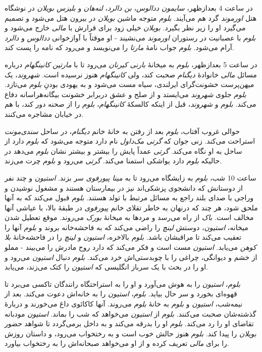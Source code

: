 \documentclass[12pt]{book}
\newcommand{\noun}[1]{\textit{\textcolor{black!70}{#1}}}
\begin{document}
    در ساعت 4 بعدازظهر، \noun{سایمون ددالوس}، \noun{بن دالرد}، \noun{لنه‌هان} و \noun{بلیزس بویلان} در نوشگاه هتل \noun{اورموند} گرد هم می‌آیند. \noun{بلوم} متوجه ماشین \noun{بویلان} در بیرون هتل می‌شود و تصمیم می‌گیرد او را زیر نظر بگیرد. \noun{بویلان} خیلی زود برای قرارش با \noun{مالی} خارج می‌شود و \noun{بلوم} با عصبانیت در رستوران \noun{اورموند} می‌نشیند - او موقتاً با آوازخوانی \noun{ددالوس} و \noun{دالرد} آرام می‌شود. \noun{بلوم} جواب نامۀ \noun{مارتا} را می‌نویسد و می‌رود که نامه را پست کند.

    در ساعت 5 بعدازظهر، \noun{بلوم} به میخانۀ \noun{بارنی کیرنان} می‌رود تا با \noun{مارتین کانینگهام} درباره مسائل \noun{مالی} خانوادۀ \noun{دیگنام} صحبت کند، ولی \noun{کانینگهام} هنوز نرسیده است. \noun{شهروند}، یک میهن‌پرست خشونت‌گرای ایرلندی، سیاه مست می‌شود و به یهودی بودنِ \noun{بلوم} می‌تازد. \noun{بلوم} جلوی \noun{شهروند} می‌ایستد و از صلح و عشق دربرابر خشونت بیگانه‌هراسانه دفاع می‌کند. \noun{بلوم} و \noun{شهروند}، قبل از اینکه کالسکۀ \noun{کانینگهام}، \noun{بلوم} را از صحنه دور کند، با هم در خیابان مشاجره می‌کنند.

    حوالی غروب آفتاب، \noun{بلوم} بعد از رفتن به خانۀ خانم \noun{دیگنام}، در ساحل \noun{سندی‌مونت} استراحت می‌کند. زنی جوان که \noun{گرتی مک‌داول} نام دارد متوجه می‌شود که \noun{بلوم} دارد از ساحل به او نگاه می‌کند. \noun{گرتی} عمداً پایش را بیشتر و بیشتر نشان \noun{بلوم} می‌دهد در حالیکه \noun{بلوم} دارد یواشکی استمنا می‌کند. \noun{گرتی} می‌رود و \noun{بلوم} چرت می‌زند.

    ساعت 10 شب، \noun{بلوم} به زایشگاه می‌رود تا به \noun{مینا پیورفوی} سر بزند. \noun{استیون} و چند نفر از دوستانش که دانشجوی پزشکی‌اند نیز در بیمارستان هستند و مشغول نوشیدن و وراجی با صدای بلند راجع به مسائل مرتبط با تولد هستند. \noun{بلوم} قبول می‌کند که به آنها ملحق شود، هر چند که درنهان به خاطر تقلای خانم \noun{پیورفوی} در طبقۀ بالا، با عیاشی آنها مخالف است. \noun{باک} از راه می‌رسد و مردها به میخانۀ \noun{بورک} می‌روند. موقع تعطیل شدن میخانه، \noun{استیون}، دوستش \noun{لینچ} را راضی می‌کند که به فاحشه‌خانه بروند و \noun{بلوم} آنها را تعقیب می‌کند تا مراقبشان باشد.
    \noun{بلوم} بالاخره، \noun{استیون} و \noun{لینچ} را در فاحشه‌خانۀ \noun{بلا کوهن} می‌یابد. \noun{استیون} مست است و فکر می‌کند که دارد روح مادرش را می‌بیند - مملو از خشم و دیوانگی، چراغی را با چوبدستی‌اش خرد می‌کند. \noun{بلوم} دنبال \noun{استیون} می‌رود و او را در بحث با یک سرباز انگلیسی که \noun{استیون} را کتک می‌زند، می‌یابد.

    \noun{بلوم}، \noun{استیون} را به هوش می‌آورد و او را به استراحتگاه رانندگان تاکسی می‌برد تا قهوه‌ای بخورد و سر حال بیاید. \noun{بلوم}، \noun{استیون} را به خانه‌اش دعوت می‌کند.
    بعد از نیمه‌شب، \noun{استیون} و \noun{بلوم} به خانۀ \noun{بلوم} می‌روند. آنها کاکائوی داغ می‌خورند و دربارۀ گذشته‌شان صحبت می‌کنند. \noun{بلوم} از \noun{استیون} می‌خواهد که شب را بماند. \noun{استیون} مودبانه تقاضای او را رد می‌کند. \noun{بلوم} او را بدرقه می‌کند و به داخل برمی‌گردد تا شواهد حضور \noun{بویلان} را پیدا کند. \noun{بلوم} هنوز حالش خوب است و به رختخواب می‌رود، و داستان روزش را برای \noun{مالی} تعریف کرده و از او می‌خواهد صبحانه‌اش را به رختخواب بیاورد.
\end{document}
